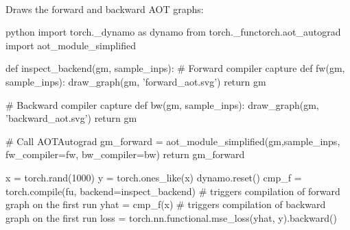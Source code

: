 \begin{examplebox}\nospacing
    \begin{example}\label{example:draw_aot_graphs}\leavevmode\\
        Draws the forward and backward AOT graphs:
        \begin{plaincodebox}{python}
            import torch._dynamo as dynamo
            from torch._functorch.aot_autograd import aot_module_simplified

            def inspect_backend(gm, sample_inps):
                # Forward compiler capture
                def fw(gm, sample_inps):
                    draw_graph(gm, 'forward_aot.svg')
                    return gm

                # Backward compiler capture
                def bw(gm, sample_inps):
                    draw_graph(gm, 'backward_aot.svg')
                    return gm

                # Call AOTAutograd
                gm_forward = aot_module_simplified(gm,sample_inps,
                                                fw_compiler=fw,
                                                bw_compiler=bw)
                return gm_forward

            x = torch.rand(1000)
            y = torch.ones_like(x)
            dynamo.reset()
            cmp_f = torch.compile(fu, backend=inspect_backend)
            # triggers compilation of forward graph on the first run
            yhat = cmp_f(x)
            # triggers compilation of backward graph on the first run
            loss = torch.nn.functional.mse_loss(yhat, y).backward()
        \end{plaincodebox}
    \end{example}
\end{examplebox}

